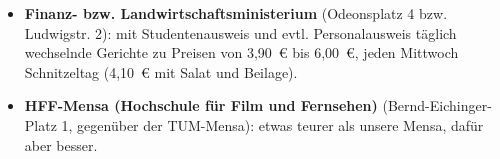\begin{itemize}
	\item \textbf{Finanz- bzw. Landwirtschaftsministerium} (Odeonsplatz 4 bzw. Ludwigstr. 2): mit Studentenausweis und evtl. Personalausweis täglich wechselnde Gerichte zu Preisen von 3,90~€ bis 6,00~€, jeden Mittwoch Schnitzeltag (4,10~€ mit Salat und Beilage).
	
	\item \textbf{HFF-Mensa (Hochschule für Film und Fernsehen)}
          (Bernd-Eichinger-Platz 1, gegenüber der TUM-Mensa): etwas
          teurer als unsere Mensa, dafür aber besser.
\end{itemize}

\begin{urlList}
\end{urlList}
